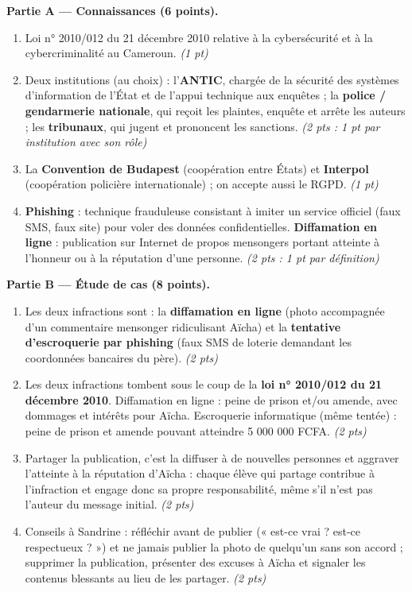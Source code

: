 \documentclass[11pt]{article}
\begin{document}
\begin{corrige}
\textbf{Partie A — Connaissances (6 points).}
\begin{enumerate}
\item Loi n° 2010/012 du 21 décembre 2010 relative à la cybersécurité et à la cybercriminalité au Cameroun. \emph{(1 pt)}
\item Deux institutions (au choix) : l'\textbf{ANTIC}, chargée de la sécurité des systèmes d'information de l'État et de l'appui technique aux enquêtes ; la \textbf{police / gendarmerie nationale}, qui reçoit les plaintes, enquête et arrête les auteurs ; les \textbf{tribunaux}, qui jugent et prononcent les sanctions. \emph{(2 pts : 1 pt par institution avec son rôle)}
\item La \textbf{Convention de Budapest} (coopération entre États) et \textbf{Interpol} (coopération policière internationale) ; on accepte aussi le RGPD. \emph{(1 pt)}
\item \textbf{Phishing} : technique frauduleuse consistant à imiter un service officiel (faux SMS, faux site) pour voler des données confidentielles. \textbf{Diffamation en ligne} : publication sur Internet de propos mensongers portant atteinte à l'honneur ou à la réputation d'une personne. \emph{(2 pts : 1 pt par définition)}
\end{enumerate}

\textbf{Partie B — Étude de cas (8 points).}
\begin{enumerate}
\item Les deux infractions sont : la \textbf{diffamation en ligne} (photo accompagnée d'un commentaire mensonger ridiculisant Aïcha) et la \textbf{tentative d'escroquerie par phishing} (faux SMS de loterie demandant les coordonnées bancaires du père). \emph{(2 pts)}
\item Les deux infractions tombent sous le coup de la \textbf{loi n° 2010/012 du 21 décembre 2010}. Diffamation en ligne : peine de prison et/ou amende, avec dommages et intérêts pour Aïcha. Escroquerie informatique (même tentée) : peine de prison et amende pouvant atteindre 5 000 000 FCFA. \emph{(2 pts)}
\item Partager la publication, c'est la diffuser à de nouvelles personnes et aggraver l'atteinte à la réputation d'Aïcha : chaque élève qui partage contribue à l'infraction et engage donc sa propre responsabilité, même s'il n'est pas l'auteur du message initial. \emph{(2 pts)}
\item Conseils à Sandrine : réfléchir avant de publier (« est-ce vrai ? est-ce respectueux ? ») et ne jamais publier la photo de quelqu'un sans son accord ; supprimer la publication, présenter des excuses à Aïcha et signaler les contenus blessants au lieu de les partager. \emph{(2 pts)}
\end{enumerate}


\end{corrige}
\end{document}

